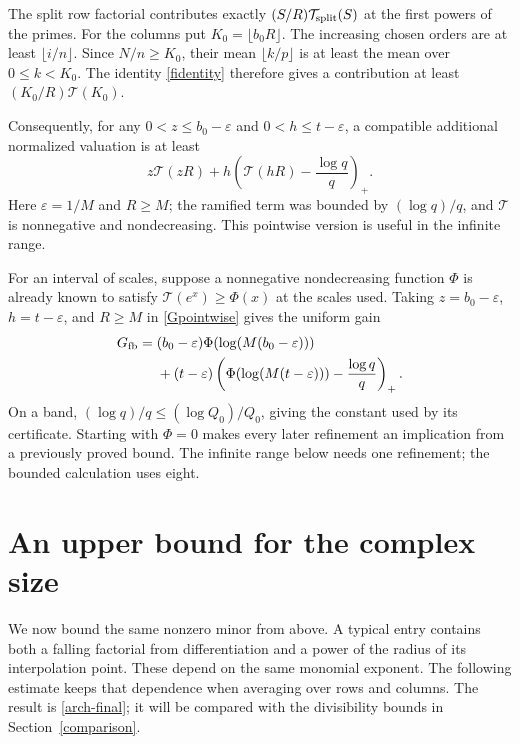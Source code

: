 \documentclass[11pt]{article}
\newcommand{\Tn}{\mathcal T}
\newcommand{\eps}{\varepsilon}
\begin{document}
The split row factorial contributes exactly
\((S/R)\Tn_{\rm split}(S)\) at the first powers of the primes.
For the columns put \(K_0=\lfloor b_0R\rfloor\). The increasing
chosen orders are at least \(\lfloor i/n\rfloor\). Since
\(N/n\ge K_0\), their mean \(\lfloor k/p\rfloor\) is at least
the mean over \(0\le k<K_0\). The identity \eqref{fidentity}
therefore gives a contribution at least
\((K_0/R)\Tn(K_0)\).

Consequently, for any
\(0<z\le b_0-\eps\) and \(0<h\le t-\eps\), a compatible
additional normalized valuation is at least
\begin{equation}\label{Gpointwise}
 z\Tn(zR)+h\left(\Tn(hR)-\frac{\log q}{q}\right)_+.
\end{equation}
Here \(\eps=1/M\) and \(R\ge M\); the ramified term was bounded
by \((\log q)/q\), and \(\Tn\) is nonnegative and nondecreasing.
This pointwise version is useful in the infinite range.

For an interval of scales, suppose a nonnegative nondecreasing function
\(\Phi\) is already known to satisfy \(\Tn(e^x)\ge\Phi(x)\)
at the scales used. Taking \(z=b_0-\eps\), \(h=t-\eps\), and
\(R\ge M\) in \eqref{Gpointwise} gives the uniform gain
\begin{align}\label{Gfeedback}
 G_{\rm fb}={}&(b_0-\eps)\Phi(\log(M(b_0-\eps)))\\
 &+(t-\eps)\left(\Phi(\log(M(t-\eps)))-\frac{\log q}{q}\right)_+.
 \notag
\end{align}
On a band, \((\log q)/q\le(\log Q_0)/Q_0\), giving the constant
used by its certificate. Starting with \(\Phi=0\) makes every later
refinement an implication from a previously proved bound. The infinite
range below needs one refinement; the bounded calculation uses eight.

\section{An upper bound for the complex size}\label{arch}
We now bound the same nonzero minor from above. A typical entry contains
both a falling factorial from differentiation and a power of the radius
of its interpolation point. These depend on the same monomial exponent.
The following estimate keeps that dependence when averaging over rows
and columns. The result is \eqref{arch-final}; it will be compared with
the divisibility bounds in Section~\ref{comparison}.
\end{document}
